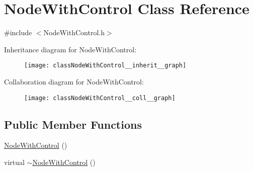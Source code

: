 \hypertarget{classNodeWithControl}{}\section{Node\+With\+Control Class Reference}
\label{classNodeWithControl}


{\ttfamily \#include $<$Node\+With\+Control.\+h$>$}



Inheritance diagram for Node\+With\+Control\+:\nopagebreak
\begin{figure}[H]
\begin{center}
\leavevmode
\texttt{[image: classNodeWithControl\_\_inherit\_\_graph]}
\end{center}
\end{figure}


Collaboration diagram for Node\+With\+Control\+:\nopagebreak
\begin{figure}[H]
\begin{center}
\leavevmode
\texttt{[image: classNodeWithControl\_\_coll\_\_graph]}
\end{center}
\end{figure}
\subsection*{Public Member Functions}
\begin{DoxyCompactItemize}
\item 
\hyperlink{classNodeWithControl_ab0a223aca65e289aaee682dadfbefb5c}{Node\+With\+Control} ()
\item 
virtual \hyperlink{classNodeWithControl_a6e752e38f0e233e7debfaaf4ae26fb2d}{$\sim$\+Node\+With\+Control} ()
\end{DoxyCompactItemize}
